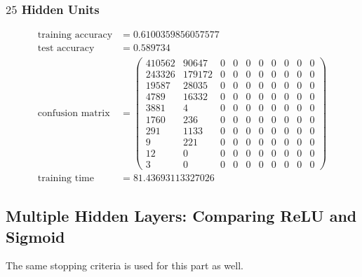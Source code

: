 \documentclass[11pt]{article}
\begin{document}
\subsubsection{$25$ Hidden Units}
\begin{equation}
  \begin{split}
    \text{training accuracy} &= 0.6100359856057577\\
    \text{test accuracy} &= 0.589734\\
    \text{confusion matrix} &=
    \begin{pmatrix}
      410562 & 90647  & 0 & 0 & 0 & 0 & 0 & 0 & 0 & 0 \\
      243326 & 179172 & 0 & 0 & 0 & 0 & 0 & 0 & 0 & 0 \\
      19587  & 28035  & 0 & 0 & 0 & 0 & 0 & 0 & 0 & 0 \\
      4789   & 16332  & 0 & 0 & 0 & 0 & 0 & 0 & 0 & 0 \\
      3881   & 4      & 0 & 0 & 0 & 0 & 0 & 0 & 0 & 0 \\
      1760   & 236    & 0 & 0 & 0 & 0 & 0 & 0 & 0 & 0 \\
      291    & 1133   & 0 & 0 & 0 & 0 & 0 & 0 & 0 & 0 \\
      9      & 221    & 0 & 0 & 0 & 0 & 0 & 0 & 0 & 0 \\
      12     & 0      & 0 & 0 & 0 & 0 & 0 & 0 & 0 & 0 \\
      3      & 0      & 0 & 0 & 0 & 0 & 0 & 0 & 0 & 0
    \end{pmatrix}\\
    \text{training time} &= 81.43693113327026
  \end{split}
\end{equation}

\subsection{Multiple Hidden Layers: Comparing ReLU and Sigmoid}
The same stopping criteria is used for this part as well.
\end{document}
